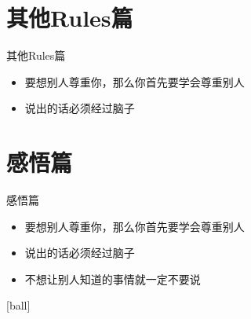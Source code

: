 

\section{其他Rules篇}
\begin{frame}{其他Rules篇}
\begin{itemize}
    \item 要想别人尊重你，那么你首先要学会尊重别人
    \item 说出的话必须经过脑子
\end{itemize}
\end{frame}

\section{感悟篇}
\begin{frame}{感悟篇}
\begin{itemize}
    \item 要想别人尊重你，那么你首先要学会尊重别人
    \item 说出的话必须经过脑子
\end{itemize}
\end{frame}

\begin{frame}
\begin{itemize}
    \item 不想让别人知道的事情就一定不要说
\end{itemize}
\end{frame}

[ball]

